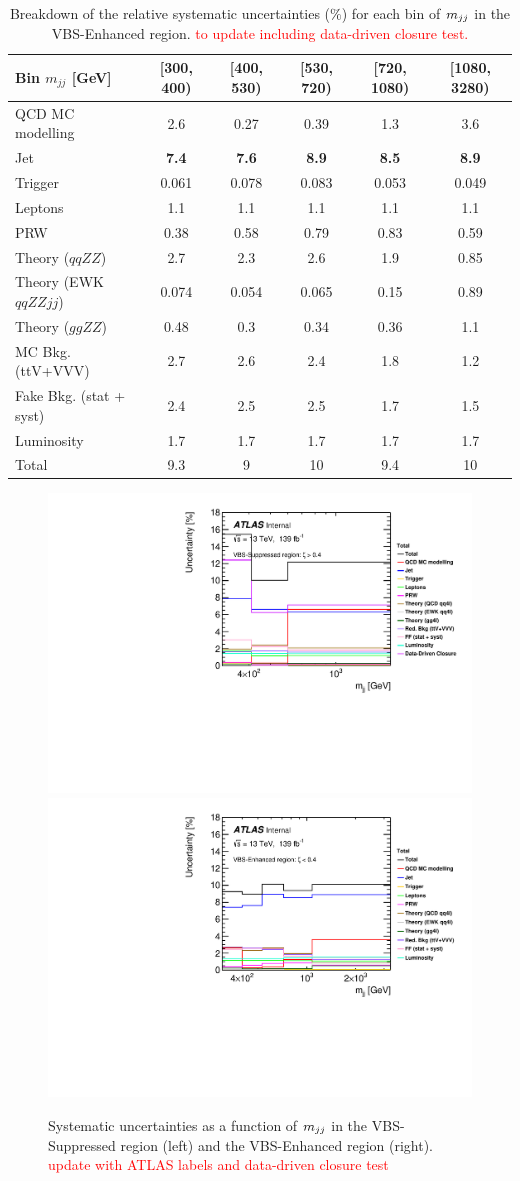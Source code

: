 \begin{table}
\centering
\begin{tabular}{| l || c | c | c | c | c | }
\hline \hline
Bin $m_{jj}$ [GeV] & [300, 400) & [400, 530) & [530, 720) & [720, 1080) & [1080, 3280)\\
\hline
QCD MC modelling & 2.6 & 0.27 & 0.39 & 1.3 & 3.6\\
Jet & \textbf{7.4} & \textbf{7.6} & \textbf{8.9} & \textbf{8.5} & \textbf{8.9}\\
Trigger & 0.061 & 0.078 & 0.083 & 0.053 & 0.049\\
Leptons & 1.1 & 1.1 & 1.1 & 1.1 & 1.1\\
PRW & 0.38 & 0.58 & 0.79 & 0.83 & 0.59\\
Theory ($qqZZ$) & 2.7 & 2.3 & 2.6 & 1.9 & 0.85\\
Theory (EWK $qqZZjj$) & 0.074 & 0.054 & 0.065 & 0.15 & 0.89\\
Theory ($ggZZ$) & 0.48 & 0.3 & 0.34 & 0.36 & 1.1\\
MC Bkg. (ttV+VVV) & 2.7 & 2.6 & 2.4 & 1.8 & 1.2\\
Fake Bkg. (stat + syst) & 2.4 & 2.5 & 2.5 & 1.7 & 1.5\\
Luminosity & 1.7 & 1.7 & 1.7 & 1.7 & 1.7\\
\hline
Total & 9.3 & 9 & 10 & 9.4 & 10\\
\hline
\end{tabular}
\caption{Breakdown of the relative systematic uncertainties ($\%$) for each bin of $m_{jj}$ in the VBS-Enhanced region. \textcolor{red}{to update including data-driven closure test. } \label{tab:systematics_mjj_VBS_Enhanced}}
\end{table}

\begin{figure}[!htb]
\centering
\includegraphics[width=.49\linewidth]{figures/Analysis/Systematics/systematics_VBS_Suppressed.pdf}
\includegraphics[width=.49\linewidth]{figures/Analysis/Systematics/systematics_VBS_Enhanced.pdf}
\caption{Systematic uncertainties as a function of $m_{jj}$ in the VBS-Suppressed region (left) and the VBS-Enhanced region (right). \textcolor{red}{update with ATLAS labels and data-driven closure test}}  \label{fig:systematics_mjj}
\end{figure}

